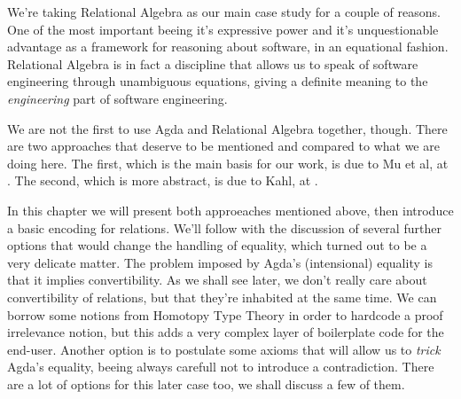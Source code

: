 We're taking Relational Algebra\cite{Bird97} as our main case study for a couple of reasons. One of the most
important beeing it's expressive power and it's unquestionable advantage as a framework for
reasoning about software, in an equational fashion. Relational Algebra is in fact a discipline that
allows us to speak of software engineering through unambiguous equations, giving a definite meaning
to the \emph{engineering} part of software engineering.

We are not the first to use Agda and Relational Algebra together, though. There are two approaches
that deserve to be mentioned and compared to what we are doing here. The first, which is the main
basis for our work, is due to Mu et al, at \cite{Jansson09}. The second, which is more abstract,
is due to Kahl, at \cite{RATHAgda}.

In this chapter we will present both approeaches mentioned above, 
then introduce a basic encoding for relations. We'll follow with the discussion of several 
further options that would change the handling of equality, which turned out to be a very
delicate matter. The problem imposed by Agda's (intensional) equality is that it implies
convertibility. As we shall see later, we don't really care about convertibility of relations,
but that they're inhabited at the same time. We can borrow some notions from Homotopy Type Theory\cite{hottbook}
in order to hardcode a proof irrelevance notion, but this adds a very complex layer of boilerplate
code for the end-user. Another option is to postulate some axioms that will allow us to \emph{trick}
Agda's equality, beeing always carefull not to introduce a contradiction. 
There are a lot of options for this later case too, we shall discuss a few of them.
